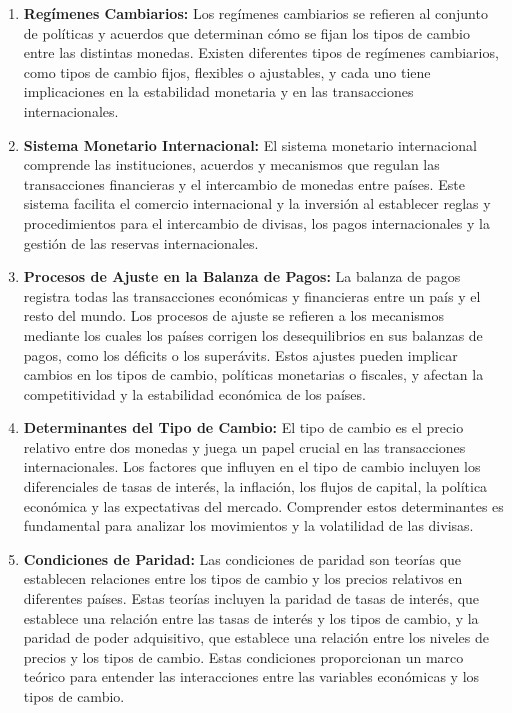 \documentclass[
  letterpaper,
  DIV=11,
  numbers=noendperiod]{scrartcl}
\begin{document}
\begin{enumerate}
\def\labelenumi{\arabic{enumi}.}
\item
  \textbf{Regímenes Cambiarios:} Los regímenes cambiarios se refieren al
  conjunto de políticas y acuerdos que determinan cómo se fijan los
  tipos de cambio entre las distintas monedas. Existen diferentes tipos
  de regímenes cambiarios, como tipos de cambio fijos, flexibles o
  ajustables, y cada uno tiene implicaciones en la estabilidad monetaria
  y en las transacciones internacionales.
\item
  \textbf{Sistema Monetario Internacional:} El sistema monetario
  internacional comprende las instituciones, acuerdos y mecanismos que
  regulan las transacciones financieras y el intercambio de monedas
  entre países. Este sistema facilita el comercio internacional y la
  inversión al establecer reglas y procedimientos para el intercambio de
  divisas, los pagos internacionales y la gestión de las reservas
  internacionales.
\item
  \textbf{Procesos de Ajuste en la Balanza de Pagos:} La balanza de
  pagos registra todas las transacciones económicas y financieras entre
  un país y el resto del mundo. Los procesos de ajuste se refieren a los
  mecanismos mediante los cuales los países corrigen los desequilibrios
  en sus balanzas de pagos, como los déficits o los superávits. Estos
  ajustes pueden implicar cambios en los tipos de cambio, políticas
  monetarias o fiscales, y afectan la competitividad y la estabilidad
  económica de los países.
\item
  \textbf{Determinantes del Tipo de Cambio:} El tipo de cambio es el
  precio relativo entre dos monedas y juega un papel crucial en las
  transacciones internacionales. Los factores que influyen en el tipo de
  cambio incluyen los diferenciales de tasas de interés, la inflación,
  los flujos de capital, la política económica y las expectativas del
  mercado. Comprender estos determinantes es fundamental para analizar
  los movimientos y la volatilidad de las divisas.
\item
  \textbf{Condiciones de Paridad:} Las condiciones de paridad son
  teorías que establecen relaciones entre los tipos de cambio y los
  precios relativos en diferentes países. Estas teorías incluyen la
  paridad de tasas de interés, que establece una relación entre las
  tasas de interés y los tipos de cambio, y la paridad de poder
  adquisitivo, que establece una relación entre los niveles de precios y
  los tipos de cambio. Estas condiciones proporcionan un marco teórico
  para entender las interacciones entre las variables económicas y los
  tipos de cambio.
\end{enumerate}
\end{document}
